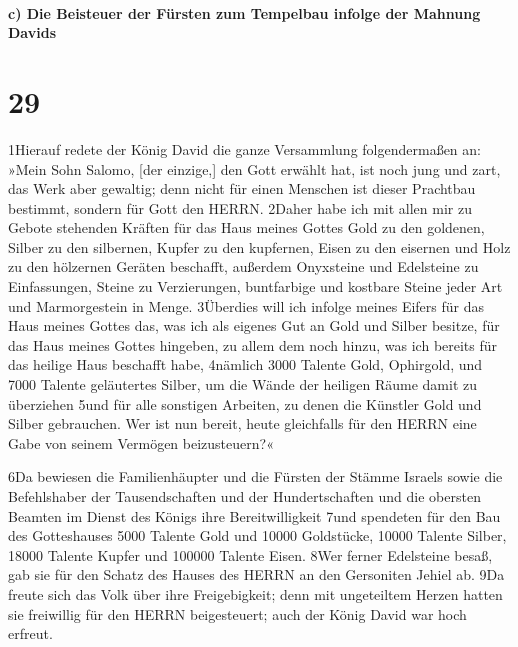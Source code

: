 \hypertarget{c-die-beisteuer-der-fuxfcrsten-zum-tempelbau-infolge-der-mahnung-davids}{%
\paragraph{c) Die Beisteuer der Fürsten zum Tempelbau infolge der
Mahnung
Davids}\label{c-die-beisteuer-der-fuxfcrsten-zum-tempelbau-infolge-der-mahnung-davids}}

\hypertarget{section-28}{%
\section{29}\label{section-28}}

1Hierauf redete der König David die ganze Versammlung folgendermaßen an:
»Mein Sohn Salomo, {[}der einzige,{]} den Gott erwählt hat, ist noch
jung und zart, das Werk aber gewaltig; denn nicht für einen Menschen ist
dieser Prachtbau bestimmt, sondern für Gott den HERRN. 2Daher habe ich
mit allen mir zu Gebote stehenden Kräften für das Haus meines Gottes
Gold zu den goldenen, Silber zu den silbernen, Kupfer zu den kupfernen,
Eisen zu den eisernen und Holz zu den hölzernen Geräten beschafft,
außerdem Onyxsteine und Edelsteine zu Einfassungen, Steine zu
Verzierungen, buntfarbige und kostbare Steine jeder Art und
Marmorgestein in Menge. 3Überdies will ich infolge meines Eifers für das
Haus meines Gottes das, was ich als eigenes Gut an Gold und Silber
besitze, für das Haus meines Gottes hingeben, zu allem dem noch hinzu,
was ich bereits für das heilige Haus beschafft habe, 4nämlich 3000
Talente Gold, Ophirgold, und 7000 Talente geläutertes Silber, um die
Wände der heiligen Räume damit zu überziehen 5und für alle sonstigen
Arbeiten, zu denen die Künstler Gold und Silber gebrauchen. Wer ist nun
bereit, heute gleichfalls für den HERRN eine Gabe von seinem Vermögen
beizusteuern?«

6Da bewiesen die Familienhäupter und die Fürsten der Stämme Israels
sowie die Befehlshaber der Tausendschaften und der Hundertschaften und
die obersten Beamten im Dienst des Königs ihre Bereitwilligkeit 7und
spendeten für den Bau des Gotteshauses 5000 Talente Gold und 10000
Goldstücke, 10000 Talente Silber, 18000 Talente Kupfer und 100000
Talente Eisen. 8Wer ferner Edelsteine besaß, gab sie für den Schatz des
Hauses des HERRN an den Gersoniten Jehiel ab. 9Da freute sich das Volk
über ihre Freigebigkeit; denn mit ungeteiltem Herzen hatten sie
freiwillig für den HERRN beigesteuert; auch der König David war hoch
erfreut.

